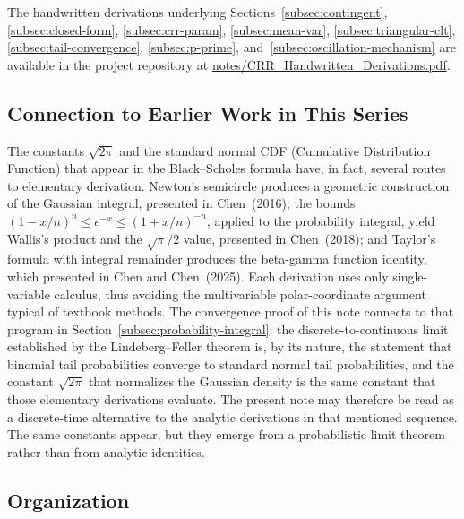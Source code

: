 \documentclass[11pt,a4paper]{article}
\theoremstyle{plain}
\theoremstyle{definition}
\begin{document}
The handwritten derivations underlying Sections~\ref{subsec:contingent}, 
\ref{subsec:closed-form}, \ref{subsec:crr-param}, \ref{subsec:mean-var}, 
\ref{subsec:triangular-clt}, \ref{subsec:tail-convergence}, 
\ref{subsec:p-prime}, and~\ref{subsec:oscillation-mechanism} are 
available in the project repository at 
\href{https://github.com/daviddavilad/option-pricing/blob/main/notes/CRR_Handwritten_Derivations.pdf}{notes/CRR\_Handwritten\_Derivations.pdf}.

\subsection{Connection to Earlier Work in This Series}

The constants $\sqrt{2\pi}$ and the standard normal CDF (Cumulative Distribution Function) that appear in
the Black--Scholes formula have, in fact, several routes to elementary
derivation. Newton's semicircle produces a geometric construction of the
Gaussian integral, presented in Chen~(2016); the bounds
$(1 - x/n)^n \leq e^{-x} \leq (1 + x/n)^{-n}$, applied to the
probability integral, yield Wallis's product and the
$\sqrt{\pi}/2$ value, presented in Chen~(2018); and Taylor's formula
with integral remainder produces the beta-gamma function identity, which
presented in Chen and Chen~(2025). Each derivation uses only
single-variable calculus, thus avoiding the multivariable polar-coordinate
argument typical of textbook methods. The convergence proof of
this note connects to that program in
Section~\ref{subsec:probability-integral}: the discrete-to-continuous
limit established by the Lindeberg--Feller theorem is, by its nature,
the statement that binomial tail probabilities converge to standard
normal tail probabilities, and the constant $\sqrt{2\pi}$ that
normalizes the Gaussian density is the same constant that those
elementary derivations evaluate. The present note may therefore be read as
a discrete-time alternative to the analytic derivations in that mentioned
sequence. The same constants appear, but they emerge from a probabilistic
limit theorem rather than from analytic identities.

\subsection{Organization}
\end{document}
